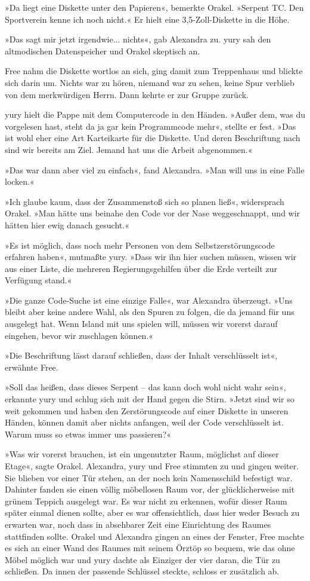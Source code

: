 »Da liegt eine Diskette unter den Papieren«, bemerkte Orakel. »Serpent TC. Den Sportverein kenne ich noch nicht.« Er hielt eine 3,5-Zoll-Diskette in die Höhe.

»Das sagt mir jetzt irgendwie... nichts«, gab Alexandra zu. yury sah den altmodischen Datenspeicher und Orakel skeptisch an.

Free nahm die Diskette wortlos an sich, ging damit zum Treppenhaus und blickte sich darin um. Nichts war zu hören, niemand war zu sehen, keine Spur verblieb von dem merkwürdigen Herrn. Dann kehrte er zur Gruppe zurück.

yury hielt die Pappe mit dem Computercode in den Händen. »Außer dem, was du vorgelesen hast, steht da ja gar kein Programmcode mehr«, stellte er fest. »Das ist wohl eher eine Art Karteikarte für die Diskette. Und deren Beschriftung nach sind wir bereits am Ziel. Jemand hat uns die Arbeit abgenommen.«

»Das war dann aber viel zu einfach«, fand Alexandra. »Man will uns in eine Falle locken.«

»Ich glaube kaum, dass der Zusammenstoß sich so planen ließ«, widersprach Orakel. »Man hätte uns beinahe den Code vor der Nase weggeschnappt, und wir hätten hier ewig danach gesucht.«

»Es ist möglich, dass noch mehr Personen von dem Selbstzerstörungscode erfahren haben«, mutmaßte yury. »Dass wir ihn hier suchen müssen, wissen wir aus einer Liste, die mehreren Regierungsgehilfen über die Erde verteilt zur Verfügung stand.«

»Die ganze Code-Suche ist eine einzige Falle«, war Alexandra überzeugt. »Uns bleibt aber keine andere Wahl, als den Spuren zu folgen, die da jemand für uns ausgelegt hat. Wenn Island mit uns spielen will, müssen wir vorerst darauf eingehen, bevor wir zuschlagen können.«

»Die Beschriftung lässt darauf schließen, dass der Inhalt verschlüsselt ist«, erwähnte Free.

»Soll das heißen, dass dieses Serpent – das kann doch wohl nicht wahr sein«, erkannte yury und schlug sich mit der Hand gegen die Stirn. »Jetzt sind wir so weit gekommen und haben den Zerstörungscode auf einer Diskette in unseren Händen, können damit aber nichts anfangen, weil der Code verschlüsselt ist. Warum muss so etwas immer uns passieren?«

»Was wir vorerst brauchen, ist ein ungenutzter Raum, möglichst auf dieser Etage«, sagte Orakel. Alexandra, yury und Free stimmten zu und gingen weiter. Sie blieben vor einer Tür stehen, an der noch kein Namensschild befestigt war. Dahinter fanden sie einen völlig möbellosen Raum vor, der glücklicherweise mit grünem Teppich ausgelegt war. Es war nicht zu erkennen, wofür dieser Raum später einmal dienen sollte, aber es war offensichtlich, dass hier weder Besuch zu erwarten war, noch dass in absehbarer Zeit eine Einrichtung des Raumes stattfinden sollte. Orakel und Alexandra gingen an eines der Fenster, Free machte es sich an einer Wand des Raumes mit seinem Örztöp so bequem, wie das ohne Möbel möglich war und yury dachte als Einziger der vier daran, die Tür zu schließen. Da innen der passende Schlüssel steckte, schloss er zusätzlich ab.

